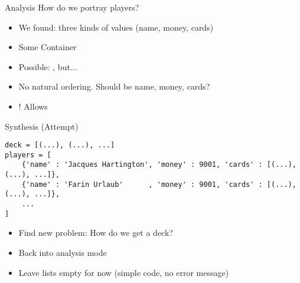 
\begin{frame}[fragile]{Analysis}
%
How do we portray players?
%
\begin{itemize}
\item We found: three kinds of values (name, money, cards)
\item[\Thus] Some Container
\item Possible: , but...
\item No natural ordering. Should  be name, money, cards?
\item[\Thus] ! Allows 
\end{itemize}
%
\end{frame}


\begin{frame}[fragile]{Synthesis (Attempt)}
%
\begin{codebox}
\begin{verbatim}
deck = [(...), (...), ...]
players = [
    {'name' : 'Jacques Hartington', 'money' : 9001, 'cards' : [(...), (...), ...]},
    {'name' : 'Farin Urlaub'      , 'money' : 9001, 'cards' : [(...), (...), ...]},
    ...
]
\end{verbatim}
\end{codebox}
%
\begin{itemize}
\item Find new problem: How do we get a deck?
\item Back into analysis mode
\item Leave lists empty for now (simple code, no error message)
\end{itemize}
%
\end{frame}


